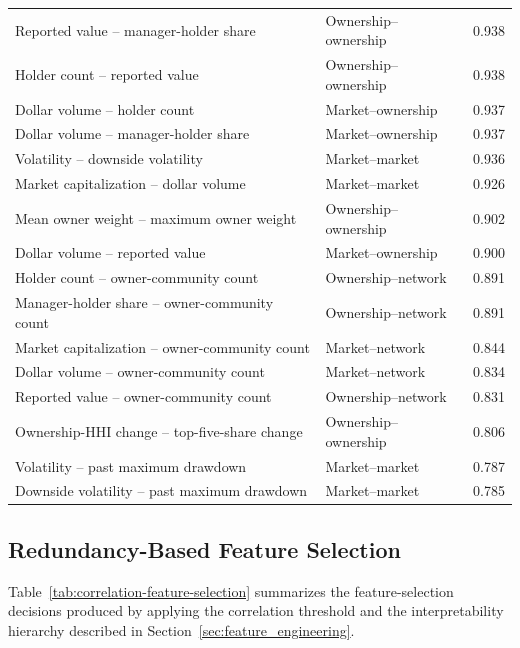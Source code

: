 \begin{longtable}{>{\raggedright\arraybackslash}p{}>{\raggedright\arraybackslash}p{}r}
        Reported value -- manager-holder share         & Ownership--ownership & 0.938  \\
        Holder count -- reported value                 & Ownership--ownership & 0.938  \\
        Dollar volume -- holder count                  & Market--ownership    & 0.937  \\
        Dollar volume -- manager-holder share          & Market--ownership    & 0.937  \\
        Volatility -- downside volatility              & Market--market       & 0.936  \\
        Market capitalization -- dollar volume         & Market--market       & 0.926  \\
        Mean owner weight -- maximum owner weight      & Ownership--ownership & 0.902  \\
        Dollar volume -- reported value                & Market--ownership    & 0.900  \\
        Holder count -- owner-community count          & Ownership--network   & 0.891  \\
        Manager-holder share -- owner-community count  & Ownership--network   & 0.891  \\
        Market capitalization -- owner-community count & Market--network      & 0.844  \\
        Dollar volume -- owner-community count         & Market--network      & 0.834  \\
        Reported value -- owner-community count        & Ownership--network   & 0.831  \\
        Ownership-HHI change -- top-five-share change  & Ownership--ownership & 0.806  \\
        Volatility -- past maximum drawdown            & Market--market       & 0.787  \\
        Downside volatility -- past maximum drawdown   & Market--market       & 0.785  \\
\end{longtable}
\endgroup

\subsection{Redundancy-Based Feature Selection}
\label{app:feature_selection_decisions}

Table~\ref{tab:correlation-feature-selection} summarizes the feature-selection decisions produced by applying the correlation threshold and the interpretability hierarchy described in Section~\ref{sec:feature_engineering}.

